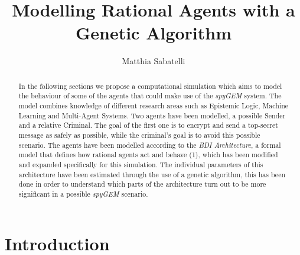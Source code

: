 \documentclass[a4paper]{article}
\begin{document}
\title {Modelling Rational Agents with a Genetic Algorithm}
\author{Matthia Sabatelli}

\pagestyle{empty}
\maketitle


\thispagestyle{empty}
\begin{abstract}

In the following sections we propose a computational simulation which aims to model the behaviour of some of the agents that could make use of the \textit{spyGEM} system. The model combines knowledge of different research areas such as Epistemic Logic, Machine Learning and Multi-Agent Systems. Two agents have been modelled, a possible Sender and a relative Criminal. The goal of the first one is to encrypt and send a top-secret message as safely as possible, while the criminal's goal is to avoid this possible scenario. The agents have been modelled according to the \textit{BDI Architecture}, a formal model that defines how rational agents act and behave (1), which has been modified and expanded specifically for this simulation. The individual parameters of this architecture have been estimated through the use of a genetic algorithm, this has been done in order to understand which parts of the architecture turn out to be more significant in a possible \textit{spyGEM} scenario.        

\end{abstract}

\section{Introduction}
\end{document}
